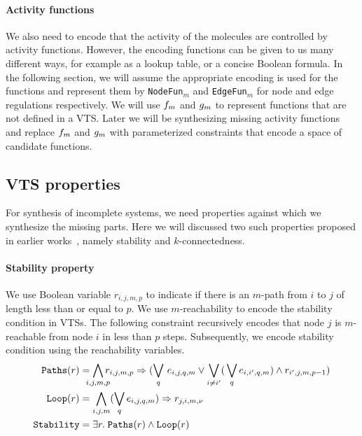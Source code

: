 \paragraph{Activity functions}
We also need to encode that
the activity of the molecules are controlled by activity functions.
%
However, the encoding functions can be given to us many different ways,
for example as a lookup table, or a concise Boolean formula.
%
In the following section, we will assume the appropriate encoding is
used for the functions and represent them by \texttt{NodeFun}$_m$
and \texttt{EdgeFun}$_m$ for node and edge regulations respectively.
%
We will use $f_m$ and $g_m$ to represent functions that
are not defined in a VTS.
%
%
Later we will be synthesizing missing activity functions and 
replace $f_m$ and $g_m$ with parameterized constraints that
encode a space of candidate functions.

\subsection{VTS properties}

For synthesis of incomplete systems,
we need properties  against which we synthesize the missing parts.
%
Here we will discussed two such properties proposed in earlier
works~\cite{SASBpaper}, namely stability and $k$-connectedness.
%

\paragraph{Stability property}
%
We use Boolean variable $r_{i,j,m,p}$ to indicate if there is an
$m$-path from $i$ to $j$ of length less than or equal to $p$.
%
We use $m$-reachability to encode the stability condition in VTSs.
%
The following constraint recursively encodes that node $j$ is
$m$-reachable from node $i$ in less than $p$ steps.
%
Subsequently, we encode stability condition using the reachability variables.
\begin{align*}
  \texttt{Paths}(r) &= \bigwedge\limits_{\mathclap{i,j,m,p}} r_{i,j,m,p} \limplies (\bigvee_{q} \, e_{i,j,q,m} \lor \bigvee_{i\neq i^{\prime}} ( \, \bigvee_{q} e_{i,i^{\prime},q,m}) \land r_{i^{\prime},j,m,p-1} )
  \\
  \texttt{Loop}(r) &= \bigwedge\limits_{i,j,m} (\bigvee_{q} e_{i,j,q,m}) \limplies r_{j,i,m,\nu}
  \\
  \texttt{Stability} &= \exists r. \; \texttt{Paths}(r) \land \texttt{Loop}(r)
\end{align*}

